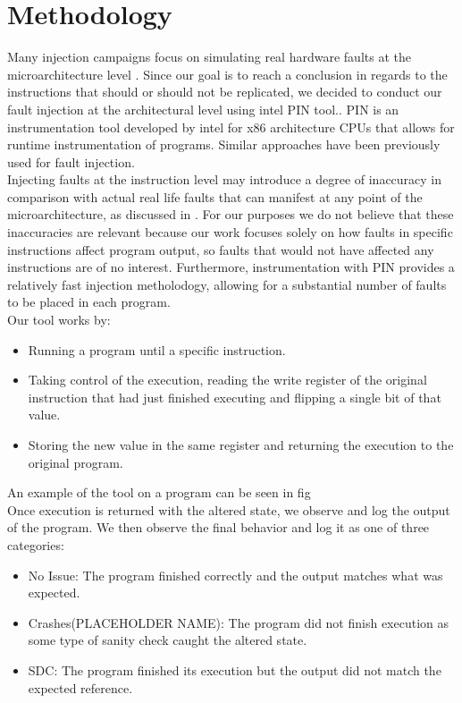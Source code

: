\documentclass[lettersize,journal]{IEEEtran}
\begin{document}
\section{Methodology}
Many injection campaigns focus on simulating real hardware faults at the microarchitecture level \cite{cho2013quantitative, olian2011modeling}. Since our goal is to reach a conclusion in regards to the instructions that should or should not be replicated, we decided to conduct our fault injection at the architectural level using intel PIN tool.\cite{luk2005pin}. PIN is an instrumentation tool developed by intel for x86 architecture CPUs that allows for runtime instrumentation of programs. Similar approaches have been previously used for fault injection.\cite{wei2014quantifying}\\
Injecting faults at the instruction level may introduce a degree of inaccuracy in comparison with actual real life faults that can manifest at any point of the microarchitecture, as discussed in \cite{cho2013quantitative}. For our purposes we do not believe that these inaccuracies are relevant because our work focuses solely on how faults in specific instructions affect program output, so faults that would not have affected any instructions are of no interest. Furthermore, instrumentation with PIN provides a relatively fast injection metholodogy, allowing for a substantial number of faults to be placed in each program.\\
Our tool works by:
\begin{itemize}
    \item Running a program until a specific instruction.
    \item Taking control of the execution, reading the write register of the original instruction that had just finished executing and flipping a single bit of that value.
    \item Storing the new value in the same register and returning the execution to the original program.
\end{itemize} 
An example of the tool on a program can be seen in fig\\
Once execution is returned with the altered state, we observe and log the output of the program. We then observe the final behavior and log it as one of three categories:
\begin{itemize}
    \item No Issue: The program finished correctly and the output matches what was expected.
    \item Crashes(PLACEHOLDER NAME): The program did not finish execution as some type of sanity check caught the altered state.
    \item SDC: The program finished its execution but the output did not match the expected reference.
\end{itemize}
\end{document}
